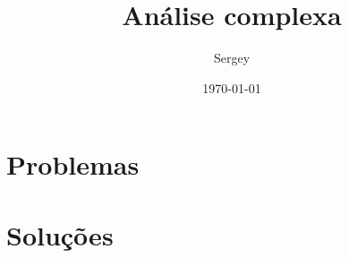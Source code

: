 \documentclass[brazilian,a4paper]{scrartcl}
\author{Sergey}
\title{Análise complexa}
\date{\today}
\begin{document}
\maketitle
\tableofcontents

\appendix
\newpage
\section{Problemas}

\newpage
\section{Soluções}

\end{document}
